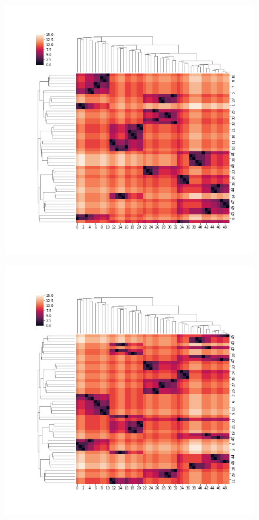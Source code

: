 \documentclass[12pt]{article}
\begin{document}
\begin{figure}
\centering
\begin{minipage}[c]{0.49\textwidth}
 	 {
	  \includegraphics[width=\textwidth]{plots/jet70TrueHeatMap_orderBS.png}
	}
\end{minipage}
\begin{minipage}[c]{0.49\textwidth}
 	 {
	  \includegraphics[width=\textwidth]{plots/jet70TrueHeatMap_orderGreedy.png}
}
\end{minipage}
\end{figure}
\end{document}
